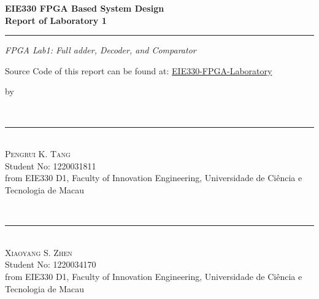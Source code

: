 \begin{titlepage}
    \ActivateWarningFilters[latex]

    \parbox{1\textwidth}{ %
        {\Large\bfseries EIE330 FPGA Based System Design}\\[0.5\baselineskip] %
        {\Huge\bfseries Report of Laboratory 1}\\[0.15\baselineskip] %
		\rule{1\textwidth}{1pt} %
        {\Large\textit{FPGA Lab1: Full adder, Decoder, and Comparator}}
    }
    \parbox{1\textwidth}{
        \vspace{1\baselineskip}
        \large
        Source Code of this report can be found at:
        \href{https://github.com/ZeppelinSCB/EIE330-FPGA-LAB-Report}
            {EIE330-FPGA-Laboratory}
    }
    \parbox{1\textwidth}{
        \vspace{1\baselineskip}
        \large by
    }
    \parbox{1\textwidth}{
        {~\\[1.7\baselineskip]}
        {\rule[1pt]{200pt}{1pt}} \\[1.25pt]
        {\huge\textsc{Pengrui K. Tang}
        }\\
        {\large{Student No: 1220031811}} \\
        \large from EIE330 D1, \newline
        Faculty of Innovation Engineering, \newline
        Universidade de Ciência e Tecnologia de Macau
    }
    \parbox{1\textwidth}{
        {~\\[1.7\baselineskip]}
        {\rule[1pt]{200pt}{1pt}} \\[1.25pt]
        {\huge\textsc{Xiaoyang S. Zhen}
            }\\
        {\large{Student No: 1220034170}} \\
        \large from EIE330 D1, \newline
        Faculty of Innovation Engineering, \newline
        Universidade de Ciência e Tecnologia de Macau
    }
	\FloatBarrier


\end{titlepage}
